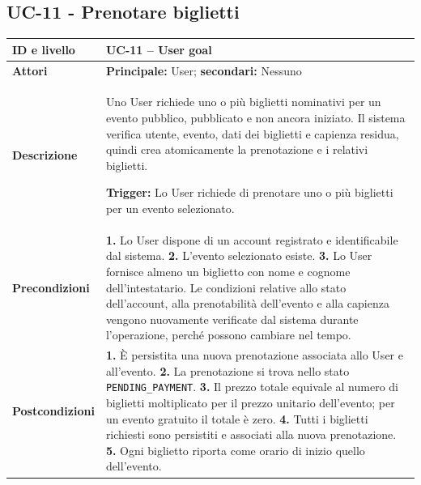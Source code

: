 \clearpage
\subsection{UC-11 - Prenotare biglietti}
\label{uc:UC-11-prenotare-biglietti}
\begingroup
\fontsize{8.3}{9.1}\selectfont
\setlength{\tabcolsep}{5pt}
\setlength{\extrarowheight}{1pt}
\setlength{\arrayrulewidth}{0.3pt}
\renewcommand{\arraystretch}{1}
\setlength{\parskip}{0pt}
\noindent\begin{tabularx}{\textwidth}{>{\columncolor{etichetteUC}\raggedright\arraybackslash\sffamily\bfseries\color{black!75}}p{2.5cm}>{\raggedright\arraybackslash}X}
\hline
ID e livello & UC-11 -- User goal \\[1pt] \hline
Attori & \textbf{Principale:} User; \textbf{secondari:} Nessuno \\[1pt] \hline
Descrizione & Uno User richiede uno o più biglietti nominativi per un evento pubblico, pubblicato e non ancora iniziato. Il sistema verifica utente, evento, dati dei biglietti e capienza residua, quindi crea atomicamente la prenotazione e i relativi biglietti.\par\textbf{Trigger:} Lo User richiede di prenotare uno o più biglietti per un evento selezionato. \\[1pt] \hline
Precondizioni & \textbf{1.} Lo User dispone di un account registrato e identificabile dal sistema. \enspace \textbf{2.} L'evento selezionato esiste. \enspace \textbf{3.} Lo User fornisce almeno un biglietto con nome e cognome dell'intestatario. Le condizioni relative allo stato dell'account, alla prenotabilità dell'evento e alla capienza vengono nuovamente verificate dal sistema durante l'operazione, perché possono cambiare nel tempo. \\[1pt] \hline
Postcondizioni & \textbf{1.} È persistita una nuova prenotazione associata allo User e all'evento. \enspace \textbf{2.} La prenotazione si trova nello stato \texttt{PENDING\_\allowbreak{}PAYMENT}. \enspace \textbf{3.} Il prezzo totale equivale al numero di biglietti moltiplicato per il prezzo unitario dell'evento; per un evento gratuito il totale è zero. \enspace \textbf{4.} Tutti i biglietti richiesti sono persistiti e associati alla nuova prenotazione. \enspace \textbf{5.} Ogni biglietto riporta come orario di inizio quello dell'evento. \\[1pt] \hline

\end{tabularx}
